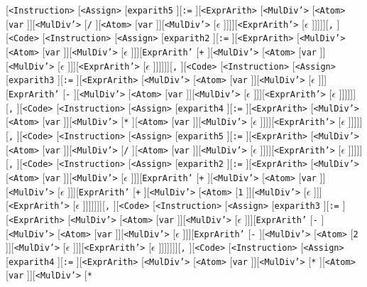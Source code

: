 \documentclass[border=5pt]{standalone}
\begin{document}
[{\texttt{<Instruction>}} [{\texttt{<Assign>}} [{\texttt{exparith5}} ][{\texttt{:=}} ][{\texttt{<ExprArith>}} [{\texttt{<MulDiv'>}} [{\texttt{<Atom>}} [{\texttt{var}} ]][{\texttt{<MulDiv'>}} [{\texttt{/}} ][{\texttt{<Atom>}} [{\texttt{var}} ]][{\texttt{<MulDiv'>}} [{$\epsilon$} ]]]][{\texttt{<ExprArith'>}} [{$\epsilon$} ]]]]][{\texttt{,}} ][{\texttt{<Code>}} [{\texttt{<Instruction>}} [{\texttt{<Assign>}} [{\texttt{exparith2}} ][{\texttt{:=}} ][{\texttt{<ExprArith>}} [{\texttt{<MulDiv'>}} [{\texttt{<Atom>}} [{\texttt{var}} ]][{\texttt{<MulDiv'>}} [{$\epsilon$} ]]][{\texttt{ExprArith'}} [{\texttt{+}} ][{\texttt{<MulDiv'>}} [{\texttt{<Atom>}} [{\texttt{var}} ]][{\texttt{<MulDiv'>}} [{$\epsilon$} ]]][{\texttt{<ExprArith'>}} [{$\epsilon$} ]]]]]][{\texttt{,}} ][{\texttt{<Code>}} [{\texttt{<Instruction>}} [{\texttt{<Assign>}} [{\texttt{exparith3}} ][{\texttt{:=}} ][{\texttt{<ExprArith>}} [{\texttt{<MulDiv'>}} [{\texttt{<Atom>}} [{\texttt{var}} ]][{\texttt{<MulDiv'>}} [{$\epsilon$} ]]][{\texttt{ExprArith'}} [{\texttt{-}} ][{\texttt{<MulDiv'>}} [{\texttt{<Atom>}} [{\texttt{var}} ]][{\texttt{<MulDiv'>}} [{$\epsilon$} ]]][{\texttt{<ExprArith'>}} [{$\epsilon$} ]]]]]][{\texttt{,}} ][{\texttt{<Code>}} [{\texttt{<Instruction>}} [{\texttt{<Assign>}} [{\texttt{exparith4}} ][{\texttt{:=}} ][{\texttt{<ExprArith>}} [{\texttt{<MulDiv'>}} [{\texttt{<Atom>}} [{\texttt{var}} ]][{\texttt{<MulDiv'>}} [{\texttt{*}} ][{\texttt{<Atom>}} [{\texttt{var}} ]][{\texttt{<MulDiv'>}} [{$\epsilon$} ]]]][{\texttt{<ExprArith'>}} [{$\epsilon$} ]]]]][{\texttt{,}} ][{\texttt{<Code>}} [{\texttt{<Instruction>}} [{\texttt{<Assign>}} [{\texttt{exparith5}} ][{\texttt{:=}} ][{\texttt{<ExprArith>}} [{\texttt{<MulDiv'>}} [{\texttt{<Atom>}} [{\texttt{var}} ]][{\texttt{<MulDiv'>}} [{\texttt{/}} ][{\texttt{<Atom>}} [{\texttt{var}} ]][{\texttt{<MulDiv'>}} [{$\epsilon$} ]]]][{\texttt{<ExprArith'>}} [{$\epsilon$} ]]]]][{\texttt{,}} ][{\texttt{<Code>}} [{\texttt{<Instruction>}} [{\texttt{<Assign>}} [{\texttt{exparith2}} ][{\texttt{:=}} ][{\texttt{<ExprArith>}} [{\texttt{<MulDiv'>}} [{\texttt{<Atom>}} [{\texttt{var}} ]][{\texttt{<MulDiv'>}} [{$\epsilon$} ]]][{\texttt{ExprArith'}} [{\texttt{+}} ][{\texttt{<MulDiv'>}} [{\texttt{<Atom>}} [{\texttt{var}} ]][{\texttt{<MulDiv'>}} [{$\epsilon$} ]]][{\texttt{ExprArith'}} [{\texttt{+}} ][{\texttt{<MulDiv'>}} [{\texttt{<Atom>}} [{\texttt{1}} ]][{\texttt{<MulDiv'>}} [{$\epsilon$} ]]][{\texttt{<ExprArith'>}} [{$\epsilon$} ]]]]]]][{\texttt{,}} ][{\texttt{<Code>}} [{\texttt{<Instruction>}} [{\texttt{<Assign>}} [{\texttt{exparith3}} ][{\texttt{:=}} ][{\texttt{<ExprArith>}} [{\texttt{<MulDiv'>}} [{\texttt{<Atom>}} [{\texttt{var}} ]][{\texttt{<MulDiv'>}} [{$\epsilon$} ]]][{\texttt{ExprArith'}} [{\texttt{-}} ][{\texttt{<MulDiv'>}} [{\texttt{<Atom>}} [{\texttt{var}} ]][{\texttt{<MulDiv'>}} [{$\epsilon$} ]]][{\texttt{ExprArith'}} [{\texttt{-}} ][{\texttt{<MulDiv'>}} [{\texttt{<Atom>}} [{\texttt{2}} ]][{\texttt{<MulDiv'>}} [{$\epsilon$} ]]][{\texttt{<ExprArith'>}} [{$\epsilon$} ]]]]]]][{\texttt{,}} ][{\texttt{<Code>}} [{\texttt{<Instruction>}} [{\texttt{<Assign>}} [{\texttt{exparith4}} ][{\texttt{:=}} ][{\texttt{<ExprArith>}} [{\texttt{<MulDiv'>}} [{\texttt{<Atom>}} [{\texttt{var}} ]][{\texttt{<MulDiv'>}} [{\texttt{*}} ][{\texttt{<Atom>}} [{\texttt{var}} ]][{\texttt{<MulDiv'>}} [{\texttt{*}} 
\end{document}
